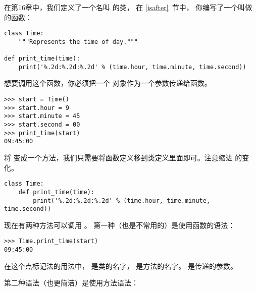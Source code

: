 在第16章中，我们定义了一个名叫  的类， 在 \ref{isafter}~节中，
你编写了一个叫做  的函数：

\begin{lstlisting}
class Time:
    """Represents the time of day."""

def print_time(time):
    print('%.2d:%.2d:%.2d' % (time.hour, time.minute, time.second))
\end{lstlisting}


想要调用这个函数，你必须把一个  对象作为一个参数传递给函数。

\begin{lstlisting}
>>> start = Time()
>>> start.hour = 9
>>> start.minute = 45
>>> start.second = 00
>>> print_time(start)
09:45:00
\end{lstlisting}


将  变成一个方法，我们只需要将函数定义移到类定义里面即可。注意缩进
的变化。
  

\begin{lstlisting}
class Time:
    def print_time(time):
        print('%.2d:%.2d:%.2d' % (time.hour, time.minute, time.second))
\end{lstlisting}


现在有两种方法可以调用 。 第一种（也是不常用的）是使用函数的语法：
  

\begin{lstlisting}
>>> Time.print_time(start)
09:45:00
\end{lstlisting}


在这个点标记法的用法中，  是类的名字， 是方法的名字。
 是传递的参数。

第二种语法（也更简洁）是使用方法语法：

